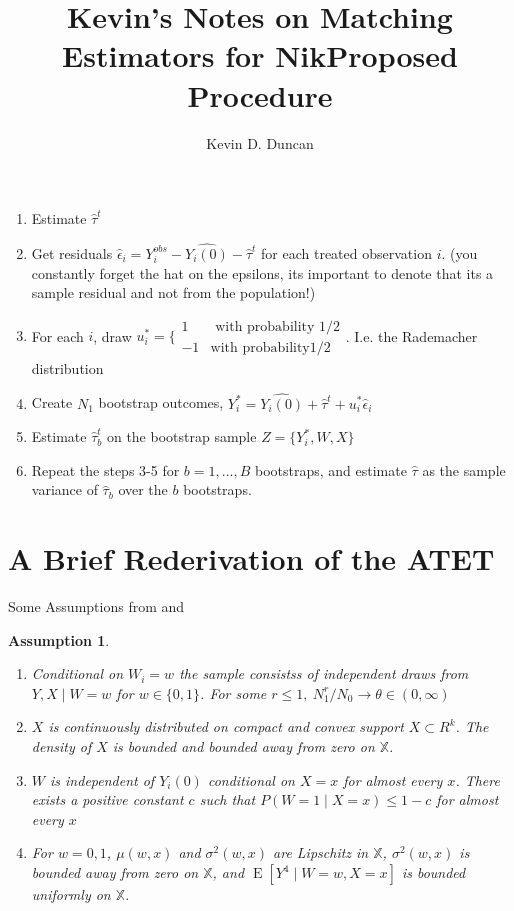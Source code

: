 \documentclass{article}
\newtheorem{assumption}{Assumption}[section]
\DeclareMathOperator{\E}{E}
\newcommand{\hta}{\hat \tau^{t}}
\newcommand{\htb}{\hat \tau_{b}^{t}}
\newcommand{\he}{\hat{\epsilon}_{i}}
\newcommand{\Yi}{Y_{i}^{obs}}
\newcommand{\Yb}{Y_{i}^{*}}
\newcommand{\hYi}{\hat{Y_{i}(0)}}
\newcommand{\us}{u_{i}^{*}}
\begin{document}
\title{Kevin's Notes on Matching Estimators for Nik}
\author{Kevin D. Duncan}
\maketitle

\begin{table}[h!]
\title{Proposed Procedure}
\begin{enumerate}
\item Estimate $\hta$
\item Get residuals $\he = \Yi-\hYi-\hta$ for each treated observation $i$. (you constantly forget the hat on the epsilons, its important to denote that its a sample residual and not from the population!)
\item For each $i$, draw $\us = \bigg\{ \begin{array}{cc} 1 & \text{ with probability } 1/2 \\ -1 & \text{with probability} 1/2 \end{array}$. I.e. the Rademacher distribution
\item Create $N_{1}$ bootstrap outcomes, $\Yb = \hYi +\hta + \us\he$
\item Estimate $\htb$ on the bootstrap sample $Z = \{\Yb, W, X\}$
\item Repeat the steps 3-5 for $b = 1,...,B$ bootstraps, and estimate $\hat \tau$ as the sample variance of $\hat \tau_{b}$ over the $b$ bootstraps.
\end{enumerate}
\label{boot}
\end{table}

\section{A Brief Rederivation of the ATET}

Some Assumptions from \cite{OnR:16} and \cite{AnI:08}

\begin{assumption}\label{ATETasmp}

\begin{enumerate}
\item Conditional on $W_{i} = w$ the sample consistss of independent draws from $Y,X \mid W = w$ for $w \in \{0,1\}$. For some $r \leq 1,\ N_{1}^{r}/N_{0} \to \theta \in (0,\infty)$
\item $X$ is continuously distributed on compact and convex support $X \subset R^{k}$. The density of $X$ is bounded and bounded away from zero on $\mathbb{X}$.
\item $W$ is independent of $Y_{i}(0)$ conditional on $X = x$ for almost every $x$. There exists a positive constant $c$ such that $P(W = 1 \mid X= x) \leq 1-c$ for almost every $x$
\item For $w = 0,1$, $\mu(w,x)$ and $\sigma^{2}(w,x)$ are Lipschitz in $\mathbb{X}$, $\sigma^{2}(w,x)$ is bounded away from zero on $\mathbb{X}$, and $\E[Y^{4} \mid W=w, X=x]$ is bounded uniformly on $\mathbb{X}$.
\end{enumerate}

\end{assumption}
\end{document}
